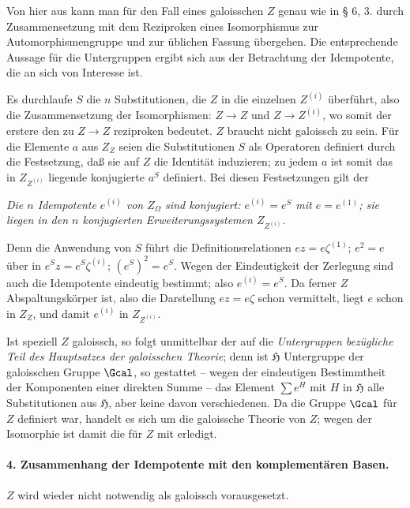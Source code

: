 Von hier aus kann man für den Fall eines galoisschen \(Z\) genau wie in § 6, 3. durch Zusammensetzung mit dem Reziproken eines Isomorphismus zur Automorphismengruppe und zur üblichen Fassung übergehen. Die entsprechende Aussage für die Untergruppen ergibt sich aus der Betrachtung der Idempotente, die an sich von Interesse ist.

\medskip
\noindent\textbf{}\quad Es durchlaufe \(S\) die \(n\) Substitutionen, die \(Z\) in die einzelnen \(Z^{(i)}\) überführt, also die Zusammensetzung der Isomorphismen: \(Z\to Z\) und \(Z\to Z^{(i)}\), wo somit der erstere den zu \(Z\to Z\) reziproken bedeutet. \(Z\) braucht nicht galoissch zu sein. Für die Elemente \(a\) aus \(Z_Z\) seien die Substitutionen \(S\) als Operatoren definiert durch die Festsetzung, daß sie auf \(Z\) die Identität induzieren; zu jedem \(a\) ist somit das in \(Z_{Z^{(i)}}\) liegende konjugierte \(a^S\) definiert. Bei diesen Festsetzungen gilt der

\noindent\textbf{} \emph{Die \(n\) Idempotente \(e^{(i)}\) von \(Z_\Omega\) sind konjugiert: \(e^{(i)}=e^S\) mit \(e=e^{(1)}\); sie liegen in den \(n\) konjugierten Erweiterungssystemen \(Z_{Z^{(i)}}\).}

Denn die Anwendung von \(S\) führt die Definitionsrelationen \(ez=e\zeta^{(1)}\); \(e^2=e\) über in \(e^Sz=e^S\zeta^{(i)}\); \((e^S)^2=e^S\). Wegen der Eindeutigkeit der Zerlegung sind auch die Idempotente eindeutig bestimmt; also \(e^{(i)}=e^S\). Da ferner \(Z\) Abspaltungskörper ist, also die Darstellung \(ez=e\zeta\) schon vermittelt, liegt \(e\) schon in \(Z_Z\), und damit \(e^{(i)}\) in \(Z_{Z^{(i)}}\).

Ist speziell \(Z\) galoissch, so folgt unmittelbar der auf die \emph{Untergruppen bezügliche Teil des Hauptsatzes der galoisschen Theorie}; denn ist \(\mathfrak H\) Untergruppe der galoisschen Gruppe \(\Gcal\), so gestattet -- wegen der eindeutigen Bestimmtheit der Komponenten einer direkten Summe -- das Element \(\sum e^H\) mit \(H\) in \(\mathfrak H\) alle Substitutionen aus \(\mathfrak H\), aber keine davon verschiedenen. Da die Gruppe \(\Gcal\) für \(Z\) definiert war, handelt es sich um die galoissche Theorie von \(Z\); wegen der Isomorphie ist damit die für \(Z\) mit erledigt.

\paragraph{4. Zusammenhang der Idempotente mit den komplementären Basen.}
\(Z\) wird wieder nicht notwendig als galoissch vorausgesetzt.

